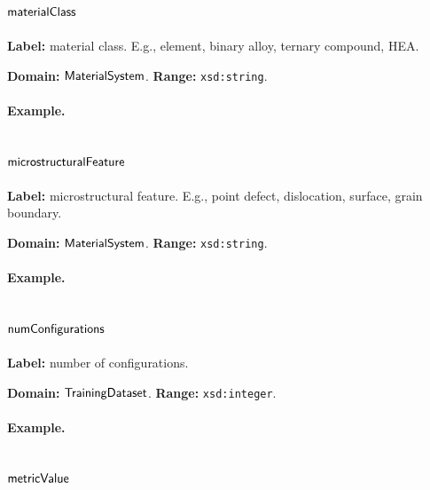 \subsection{$\mathsf{materialClass}$}
\label{sec:term-materialClass}

\textbf{Label:} material class.
E.g., element, binary alloy, ternary compound, HEA.

\textbf{Domain:} $\mathsf{MaterialSystem}$.
\textbf{Range:} \texttt{xsd:string}.

\paragraph{Example.}

\subsection{$\mathsf{microstructuralFeature}$}
\label{sec:term-microstructuralFeature}

\textbf{Label:} microstructural feature.
E.g., point defect, dislocation, surface, grain boundary.

\textbf{Domain:} $\mathsf{MaterialSystem}$.
\textbf{Range:} \texttt{xsd:string}.

\paragraph{Example.}

\subsection{$\mathsf{numConfigurations}$}
\label{sec:term-numConfigurations}

\textbf{Label:} number of configurations.

\textbf{Domain:} $\mathsf{TrainingDataset}$.
\textbf{Range:} \texttt{xsd:integer}.

\paragraph{Example.}

\subsection{$\mathsf{metricValue}$}
\label{sec:term-metricValue}


